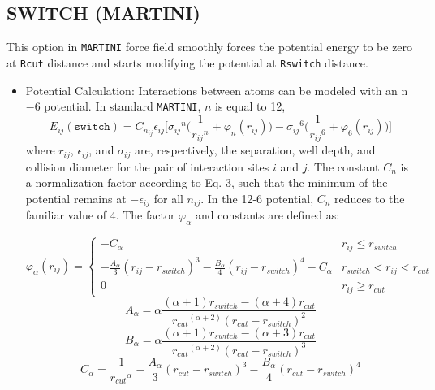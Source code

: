 \subsection{SWITCH (MARTINI)} This option in \texttt{MARTINI} force field smoothly forces the potential energy to be zero at \texttt{Rcut} distance and starts modifying the potential at \texttt{Rswitch} distance.
\begin{itemize}
	\item Potential Calculation: Interactions between atoms can be modeled with an n$-$6 potential. In standard \texttt{MARTINI}, $n$ is equal to 12,
	\begin{equation}
	E_{ij}(\texttt{switch}) = C_{n_{ij}}\epsilon_{ij} \Bigg[ {\sigma_{ij}}^{n} \bigg(\frac{1}{{r_{ij}}^{n}} + \varphi_{n} (r_{ij}) \bigg) - {\sigma_{ij}}^{6} \bigg(\frac{1}{{r_{ij}}^{6}} + \varphi_{6} (r_{ij}) \bigg) \Bigg]
	\end{equation}
where $r_{ij}$, $\epsilon_{ij}$, and $\sigma_{ij}$ are, respectively, the separation, well depth, and collision diameter for the pair of interaction sites $i$ and $j$. The constant $C_n$ is a normalization factor according to Eq. 3, such that the minimum of the potential remains at $-\epsilon_{ij}$ for all $n_{ij}$. In the 12-6 potential, $C_n$ reduces to the familiar value of 4.
\newpage
The factor $\varphi_{\alpha}$ and constants are defined as:

\[
	\varphi_{\alpha}(r_{ij}) = 
	\begin{cases}
		-C_{\alpha} & r_{ij} \leq r_{switch} \\
		-\frac{A_{\alpha}}{3} (r_{ij} - r_{switch})^3 -\frac{B_{\alpha}}{4} (r_{ij} - r_{switch})^4 - C_{\alpha} & r_{switch} < r_{ij} < r_{cut} \\
		0 & r_{ij} \geq r_{cut}
	\end{cases}
\]
\begin{equation}
\end{equation}
\begin{equation}
	A_{\alpha} = \alpha \frac{(\alpha + 1) r_{switch} - (\alpha +4) r_{cut}} {{r_{cut}}^{(\alpha + 2)} {(r_{cut} - r_{switch})}^2}
\end{equation}
\begin{equation}
	B_{\alpha} = \alpha \frac{(\alpha + 1) r_{switch} - (\alpha +3) r_{cut}} {{r_{cut}}^{(\alpha + 2)} {(r_{cut} - r_{switch})}^3}
\end{equation}
\begin{equation}
	C_{\alpha} =  \frac{1}{{r_{cut}}^{\alpha}} -\frac{A_{\alpha}}{3} (r_{cut} - r_{switch})^3 -\frac{B_{\alpha}}{4} (r_{cut} - r_{switch})^4
\end{equation}


\end{itemize}
